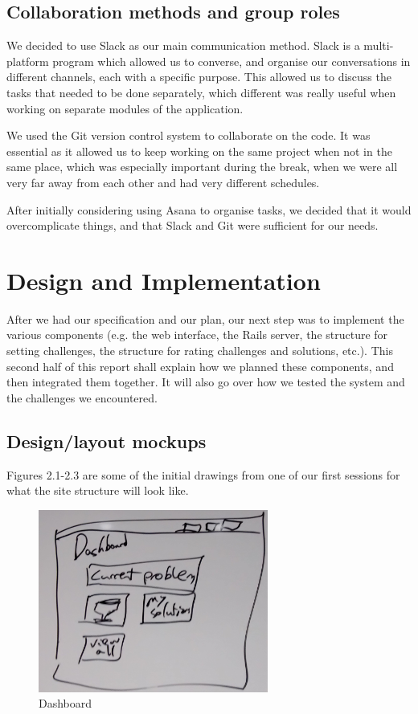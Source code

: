 \documentclass{report}
\begin{document}
\clearpage

\section{Collaboration methods and group roles}
We decided to use Slack as our main communication method. Slack is a multi-platform program which allowed us to converse, and organise our conversations in different channels, each with a specific purpose. This allowed us to discuss the tasks that needed to be done separately, which different was really useful when working on separate modules of the application.

We used the Git version control system to collaborate on the code. It was essential as it allowed us to keep working on the same project when not in the same place, which was especially important during the break, when we were all very far away from each other and had very different schedules.

After initially considering using Asana to organise tasks, we decided that it would overcomplicate things, and that Slack and Git were sufficient for our needs.

\chapter{Design and Implementation}
After we had our specification and our plan, our next step was to implement the various components (e.g. the web interface, the Rails server, the structure for setting challenges, the structure for rating challenges and solutions, etc.). This second half of this report shall explain how we planned these components, and then integrated them together. It will also go over how we tested the system and the challenges we encountered.

\section{Design/layout mockups}
Figures 2.1-2.3 are some of the initial drawings from one of our first sessions for what the site structure will look like.

\begin{figure}[H]
\centerline{\includegraphics[height=6cm]{dashboardMockup}}
\caption{Dashboard}
\end{figure}
\end{document}

